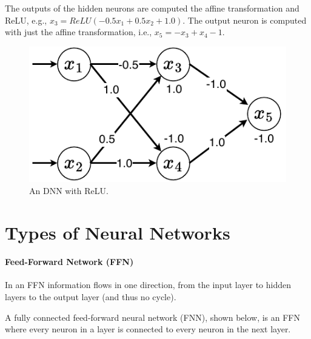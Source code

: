 \documentclass[oneside,11pt,dvipsnames]{book}
\begin{document}
The outputs of the hidden neurons  are computed the affine transformation and ReLU, e.g., $x_3 = ReLU(-0.5x_1+0.5x_2+1.0)$. The output neuron is computed with just the affine transformation, i.e., $x_5=-x_3+x_4-1$.


\begin{figure}
    \centering
    \includegraphics[width=0.4\linewidth]{figure/dnn.pdf}
    \caption{\label{fig:dnn} An DNN with ReLU.}
\end{figure}


\section{Types of Neural Networks}


\paragraph{Feed-Forward Network (FFN)} In an FFN information flows in one direction, from the input layer to hidden layers to the output layer (and thus no cycle).  

A fully connected feed-forward neural network (FNN), shown below, is an FFN where every neuron in a layer is connected to every neuron in the next layer.
\begin{center}
\end{center}
\end{document}
